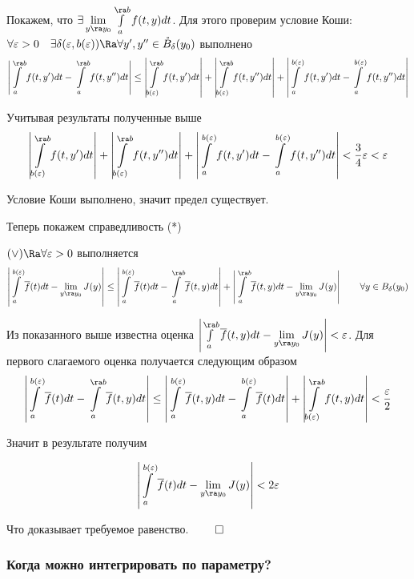 Покажем, что $\exists \lim\limits_{y \ra y_0}\int\limits_a^{\ra b} f(t, y) dt$. Для этого проверим условие Коши: $\forall \varepsilon > 0 \quad \exists \delta(\varepsilon, b(\varepsilon)) \Ra \forall y', y'' \in \mathring{B}_\delta(y_0)$ выполнено
$$\left| \int\limits_a^{\ra b}f(t, y') dt - \int\limits_a^{\ra b} f(t, y'')dt \right| \leq \left| \int\limits_{b(\varepsilon)}^{\ra b} f(t, y')dt \right| + \left| \int\limits_{b(\varepsilon)}^{\ra b} f(t, y'')dt \right| + \left| \int\limits_a^{b(\varepsilon)}f(t, y') dt - \int\limits_a^{b(\varepsilon)} f(t, y'')dt \right|$$

Учитывая результаты полученные выше
$$\left| \int\limits_{b(\varepsilon)}^{\ra b} f(t, y')dt \right| + \left| \int\limits_{b(\varepsilon)}^{\ra b} f(t, y'')dt \right| + \left| \int\limits_a^{b(\varepsilon)}f(t, y') dt - \int\limits_a^{b(\varepsilon)} f(t, y'')dt \right| < \frac{3}{4}\varepsilon < \varepsilon$$

Условие Коши выполнено, значит предел существует.

Теперь покажем справедливость (*)

$(\vee) \Ra \forall \varepsilon > 0$ выполняется
$$\left| \int\limits^{b(\varepsilon)}_a \overline{f}(t) dt - \lim\limits_{y \ra y_0} J(y) \right| \leq \left| \int\limits^{b(\varepsilon)}_a \overline{f}(t) dt - \int\limits^{\ra b}_a \overline{f}(t, y) dt \right| + \left| \int\limits^{\ra b}_a \overline{f}(t, y) dt - \lim\limits_{y \ra y_0} J(y) \right| \qquad \forall y \in B_\delta(y_0)$$

Из показанного выше известна оценка $\left| \int\limits^{\ra b}_a \overline{f}(t, y) dt - \lim\limits_{y \ra y_0} J(y) \right| < \varepsilon$. Для первого слагаемого оценка получается следующим образом
$$\left| \int\limits^{b(\varepsilon)}_a \overline{f}(t) dt - \int\limits^{\ra b}_a \overline{f}(t, y) dt \right| \leq \left| \int\limits_a^{b(\varepsilon)}\overline{f}(t, y) dt - \int\limits_a^{b(\varepsilon)}\overline{f}(t) dt\right| + \left| \int\limits_{b(\varepsilon)}^{\ra b} f(t, y) dt \right| < \frac{\varepsilon}{2}$$

Значит в результате получим

$$\left| \int\limits^{b(\varepsilon)}_a \overline{f}(t) dt - \lim\limits_{y \ra y_0} J(y) \right| < 2 \varepsilon$$

Что доказывает требуемое равенство. $\qed$

\subsubsection{Когда можно интегрировать по параметру?}

